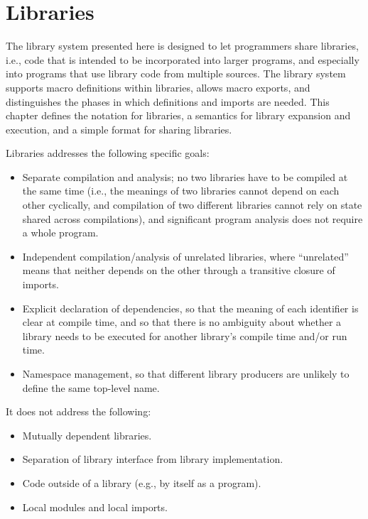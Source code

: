 \chapter{Libraries}
\label{librarychapter}

The library system presented here is designed to let programmers share
libraries, i.e., code that is intended to be incorporated into larger
programs, and especially into programs that use library code from multiple
sources.  The library system supports macro definitions within libraries,
allows macro exports, and distinguishes the phases in which definitions
and imports are needed.  This chapter defines the notation for
libraries, a semantics for library expansion and execution, and a simple
format for sharing libraries.

Libraries addresses the following specific goals:

\begin{itemize}
\item Separate compilation and analysis; no two libraries have to be
  compiled at the same time (i.e., the meanings of two libraries
  cannot depend on each other cyclically, and compilation of two
  different libraries cannot rely on state shared across
  compilations), and significant program analysis does not require a
  whole program.
\item Independent compilation/analysis of unrelated libraries, where
  ``unrelated'' means that neither depends on the other through a
  transitive closure of imports.
\item Explicit declaration of dependencies, so that the meaning of
  each identifier is clear at compile time, and so that there is no
  ambiguity about whether a library needs to be executed for another
  library's compile time and/or run time.
\item Namespace management, so that different library producers are
  unlikely to define the same top-level name.
\end{itemize}

It does not address the following:

\begin{itemize}
\item Mutually dependent libraries.
\item Separation of library interface from library implementation.
\item Code outside of a library (e.g., {} by itself as a program).
\item Local modules and local imports. 
\end{itemize}

